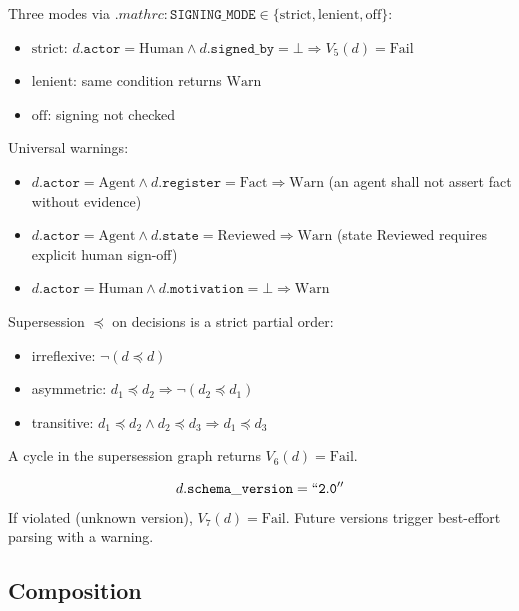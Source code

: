 \begin{proposition}
Three modes via $.mathrc\!:\!\mathtt{SIGNING\_MODE} \in \{\mathrm{strict}, \mathrm{lenient}, \mathrm{off}\}$:
\begin{itemize}
\item $\mathrm{strict}$: $d.\mathtt{actor} = \mathrm{Human} \wedge d.\mathtt{signed\_by} = \bot \Rightarrow V_5(d) = \mathrm{Fail}$
\item $\mathrm{lenient}$: same condition returns $\mathrm{Warn}$
\item $\mathrm{off}$: signing not checked
\end{itemize}
Universal warnings:
\begin{itemize}
\item $d.\mathtt{actor} = \mathrm{Agent} \wedge d.\mathtt{register} = \mathrm{Fact} \Rightarrow \mathrm{Warn}$ (an agent shall not assert fact without evidence)
\item $d.\mathtt{actor} = \mathrm{Agent} \wedge d.\mathtt{state} = \mathrm{Reviewed} \Rightarrow \mathrm{Warn}$ (state Reviewed requires explicit human sign-off)
\item $d.\mathtt{actor} = \mathrm{Human} \wedge d.\mathtt{motivation} = \bot \Rightarrow \mathrm{Warn}$
\end{itemize}
\end{proposition}

\begin{proposition}
Supersession $\preceq$ on decisions is a strict partial order:
\begin{itemize}
\item irreflexive: $\neg(d \preceq d)$
\item asymmetric: $d_1 \preceq d_2 \Rightarrow \neg(d_2 \preceq d_1)$
\item transitive: $d_1 \preceq d_2 \wedge d_2 \preceq d_3 \Rightarrow d_1 \preceq d_3$
\end{itemize}
A cycle in the supersession graph returns $V_6(d) = \mathrm{Fail}$.
\end{proposition}

\begin{proposition}
$$d.\mathtt{schema\_version} = \mathtt{``2.0''}$$
If violated (unknown version), $V_7(d) = \mathrm{Fail}$. Future
versions trigger best-effort parsing with a warning.
\end{proposition}

\subsection{Composition}

